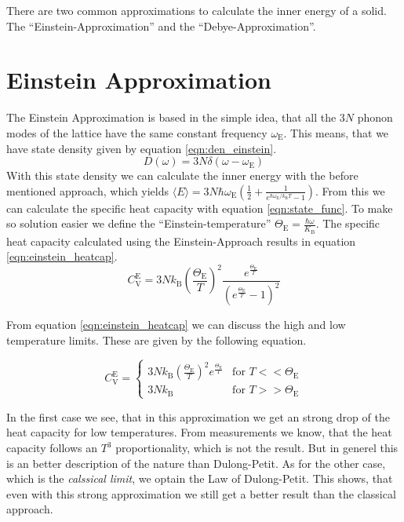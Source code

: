 There are two common approximations to calculate the inner energy of a solid. The \enquote{Einstein-Approximation} and the \enquote{Debye-Approximation}.

\section{Einstein Approximation}
\label{sec:einstein}
The Einstein Approximation is based in the simple idea, that all the $3N$ phonon modes of the lattice have the same constant frequency $\omega_\mathrm{E}$. This means, that we have
state density given by equation \ref{eqn:den_einstein}.
\begin{equation}
    \label{eqn:den_einstein}
    D(\omega) = 3N\delta(\omega - \omega_\mathrm{E})
\end{equation}
With this state density we can calculate the inner energy with the before mentioned approach, which yields 
$\langle E \rangle = 3N\hbar\omega_\mathrm{E}(\frac{1}{2}+\frac{1}{e^{\hbar\omega_\mathrm{E}/k_\mathrm{B}T}-1})$. From this we can calculate the specific heat capacity with equation 
\ref{eqn:state_func}. To make so solution easier we define the \enquote{Einstein-temperature} $\Theta_\mathrm{E} = \frac{\hbar\omega}{K_\mathrm{B}}$. The specific heat capacity 
calculated using the Einstein-Approach results in equation \ref{eqn:einstein_heatcap}.
\begin{equation}
    \label{eqn:einstein_heatcap}
    C_{\mathrm{V}}^{\mathrm{E}} = 3Nk_\mathrm{B}\left(\frac{\Theta_\mathrm{E}}{T}\right)^2\frac{e^{\frac{\Theta_\mathrm{E}}{T}}}{\left(e^{\frac{\Theta_\mathrm{E}}{T}}-1\right)^2}
\end{equation} 

From equation \ref{eqn:einstein_heatcap} we can discuss the high and low temperature limits. These are given by the following equation.

\begin{equation*}
    C_{\mathrm{V}}^{\mathrm{E}} =
    \begin{cases}
        3Nk_\mathrm{B}\left(\frac{\Theta_\mathrm{E}}{T}\right)^2 e^{\frac{\Theta_\mathrm{E}}{T}} & \text{for } T <<  \Theta_\mathrm{E} \\
        3Nk_\mathrm{B} & \text{for } T >>  \Theta_\mathrm{E}
    \end{cases}
\end{equation*}

In the first case we see, that in this approximation we get an strong drop of the heat capacity for low temperatures. From measurements we know, that the heat capacity follows an $T^3$ proportionality,
which is not the result. But in generel this is an better description of the nature than Dulong-Petit. As for the other case, which is the \textit{calssical limit}, we optain the 
Law of Dulong-Petit. This shows, that even with this strong approximation we still get a better result than the classical approach.

